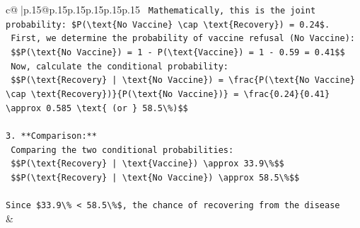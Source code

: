 \documentclass{article}
\begin{document}
{\begin{supertabular}{c@{$\;$}|p{.15\linewidth}@{}p{.15\linewidth}p{.15\linewidth}p{.15\linewidth}p{.15\linewidth}p{.15\linewidth}}
{{{\texttt{    Mathematically, this is the joint probability: \$P(\textbackslash{}text\{No Vaccine\} \textbackslash{}cap \textbackslash{}text\{Recovery\}) = 0.24\$.} \\
\texttt{    First, we determine the probability of vaccine refusal (No Vaccine):} \\
\texttt{    \$\$P(\textbackslash{}text\{No Vaccine\}) = 1 {-} P(\textbackslash{}text\{Vaccine\}) = 1 {-} 0.59 = 0.41\$\$} \\
\texttt{    Now, calculate the conditional probability:} \\
\texttt{    \$\$P(\textbackslash{}text\{Recovery\} | \textbackslash{}text\{No Vaccine\}) = \textbackslash{}frac\{P(\textbackslash{}text\{No Vaccine\} \textbackslash{}cap \textbackslash{}text\{Recovery\})\}\{P(\textbackslash{}text\{No Vaccine\})\} = \textbackslash{}frac\{0.24\}\{0.41\} \textbackslash{}approx 0.585 \textbackslash{}text\{ (or \} 58.5\textbackslash{}\%)\$\$} \\
\\ 
\texttt{3.  **Comparison:**} \\
\texttt{    Comparing the two conditional probabilities:} \\
\texttt{    \$\$P(\textbackslash{}text\{Recovery\} | \textbackslash{}text\{Vaccine\}) \textbackslash{}approx 33.9\textbackslash{}\%\$\$} \\
\texttt{    \$\$P(\textbackslash{}text\{Recovery\} | \textbackslash{}text\{No Vaccine\}) \textbackslash{}approx 58.5\textbackslash{}\%\$\$} \\
\\ 
\texttt{Since \$33.9\textbackslash{}\% < 58.5\textbackslash{}\%\$, the chance of recovering from the disease} \\
            }
        }
    }
    & \\ \\


\end{supertabular}}
\end{document}
